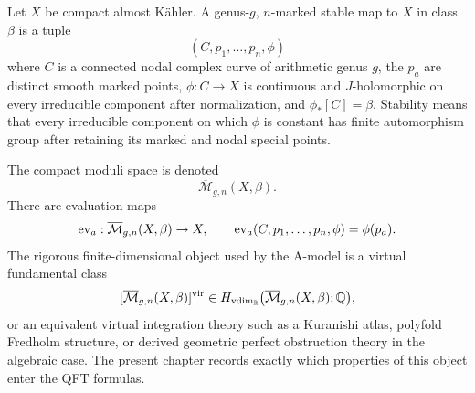 \begin{definition}
Let \(X\) be compact almost K\"ahler.  A genus-\(g\), \(n\)-marked stable map
to \(X\) in class \(\beta\) is a tuple
\[
  (C,p_1,\ldots,p_n,\phi)
\]
where \(C\) is a connected nodal complex curve of arithmetic genus \(g\),
the \(p_a\) are distinct smooth marked points, \(\phi:C\to X\) is continuous
and \(J\)-holomorphic on every irreducible component after normalization, and
\(\phi_\ast[C]=\beta\).  Stability means that every irreducible component on
which \(\phi\) is constant has finite automorphism group after retaining its
marked and nodal special points.
\end{definition}

The compact moduli space is denoted
\[
  \overline{\mathcal M}_{g,n}(X,\beta).
\]
There are evaluation maps
\[
  {\rm ev}_a:\overline{\mathcal M}_{g,n}(X,\beta)\to X,
  \qquad
  {\rm ev}_a(C,p_1,\ldots,p_n,\phi)=\phi(p_a).
\]
The rigorous finite-dimensional object used by the A-model is a virtual
fundamental class
\[
  [\overline{\mathcal M}_{g,n}(X,\beta)]^{\rm vir}
  \in
  H_{{\rm vdim}_{\mathbb R}}\bigl(\overline{\mathcal M}_{g,n}(X,\beta);\mathbb Q\bigr),
\]
or an equivalent virtual integration theory such as a Kuranishi atlas,
polyfold Fredholm structure, or derived geometric perfect obstruction theory
in the algebraic case.  The present chapter records exactly which properties
of this object enter the QFT formulas.


